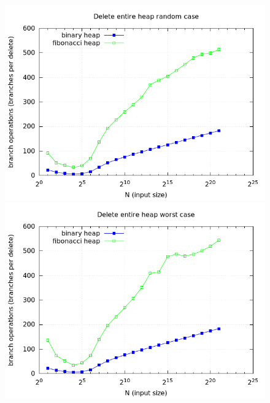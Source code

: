 \documentclass[a4paper,oneside,article,11pt]{memoir}
\begin{document}
\begin{figure}[H]
\centering
\begin{minipage}{0.48\columnwidth}
  \centering
  \includegraphics[width=\linewidth]{../res/delmin/delmin_del_all_branch_random.png}%
  \caption{}
  \label{fig:delmin_all_random_branch}
\end{minipage}%
\hfill
\begin{minipage}{0.48\columnwidth}
  \centering
  \includegraphics[width=\linewidth]{../res/delmin/delmin_del_all_branch_worst.png}%
  \caption{}
  \label{fig:delmin_all_worst_branch}
\end{minipage}
\end{figure}
\end{document}
